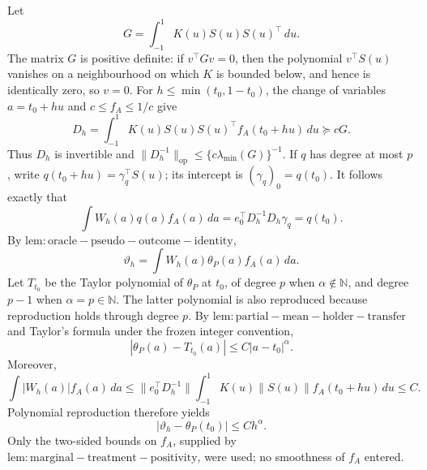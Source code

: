Let
\[
G=\int_{-1}^1K(u)S(u)S(u)^\top\,du.
\]
The matrix \(G\) is positive definite: if \(v^\top Gv=0\), then the polynomial \(v^\top S(u)\) vanishes on a neighbourhood on which \(K\) is bounded below, and hence is identically zero, so \(v=0\).  For \(h\le\min(t_0,1-t_0)\), the change of variables \(a=t_0+hu\) and \(c\le f_A\le1/c\) give
\[
D_h=\int_{-1}^1K(u)S(u)S(u)^\top f_A(t_0+hu)\,du\succeq cG.
\]
Thus \(D_h\) is invertible and \(\|D_h^{-1}\|_{\mathrm{op}}\le\{c\lambda_{\min}(G)\}^{-1}\).  If \(q\) has degree at most \(p\), write \(q(t_0+hu)=\gamma_q^\top S(u)\); its intercept is \((\gamma_q)_0=q(t_0)\).  It follows exactly that
\[
\int W_h(a)q(a)f_A(a)\,da
=e_0^\top D_h^{-1}D_h\gamma_q=q(t_0).
\]
By \(\mathrm{lem:oracle-pseudo-outcome-identity}\),
\[
\vartheta_h=\int W_h(a)\theta_P(a)f_A(a)\,da.
\]
Let \(T_{t_0}\) be the Taylor polynomial of \(\theta_P\) at \(t_0\), of degree \(p\) when \(\alpha\notin\mathbb N\), and degree \(p-1\) when \(\alpha=p\in\mathbb N\).  The latter polynomial is also reproduced because reproduction holds through degree \(p\).  By \(\mathrm{lem:partial-mean-holder-transfer}\) and Taylor's formula under the frozen integer convention,
\[
|\theta_P(a)-T_{t_0}(a)|\le C|a-t_0|^\alpha.
\]
Moreover,
\[
\int|W_h(a)|f_A(a)\,da
\le \|e_0^\top D_h^{-1}\|
\int_{-1}^1K(u)\|S(u)\|f_A(t_0+hu)\,du\le C.
\]
Polynomial reproduction therefore yields
\[
|\vartheta_h-\theta_P(t_0)|
\le C h^\alpha.
\]
Only the two-sided bounds on \(f_A\), supplied by \(\mathrm{lem:marginal-treatment-positivity}\), were used; no smoothness of \(f_A\) entered.